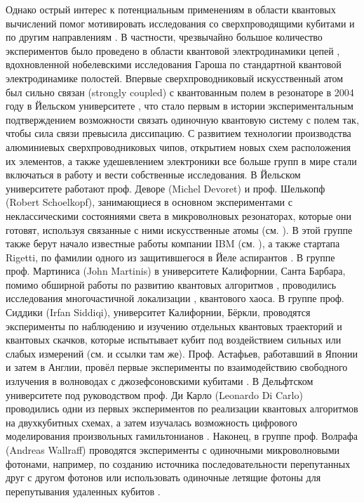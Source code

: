 \documentclass[14pt, a4paper]{extreport}
\numberwithin{equation}{section}
\begin{document}
Однако острый интерес к потенциальным применениям в области квантовых вычислений помог мотивировать исследования со сверхпроводящими кубитами и по другим направлениям \cite{kjaergaard2020superconducting}. В частности, чрезвычайно большое количество экспериментов было проведено в области квантовой электродинамики цепей \cite{blais2020quantum}, вдохновленной нобелевскими исследования Гароша \cite{haroche2013nobel} по стандартной квантовой электродинамике полостей. Впервые сверхпроводниковый искусственный атом был сильно связан (strongly coupled) с квантованным полем в резонаторе в 2004 году в Йельском университете \cite{wallraff2004strong}, что стало первым в истории экспериментальным подтверждением возможности связать одиночную квантовую систему с полем так, чтобы сила связи превысила диссипацию. С развитием технологии производства алюминиевых сверхпроводниковых чипов, открытием новых схем расположения их элементов, а также удешевлением электроники все больше групп в мире стали включаться в работу и вести собственные исследования. В Йельском университете работают проф. Деворе (Michel Devoret) и проф. Шелькопф (Robert Schoelkopf), занимающиеся в основном экспериментами с неклассическими состояниями света в микроволновых резонаторах, которые они готовят, используя связанные с ними искусственные атомы (см. \cite{vlastakis2013deterministically, mirrahimi2014dynamically}). В этой группе также берут начало известные работы компании IBM (см. \cite{jurcevic2020demonstration}), а также стартапа Rigetti, по фамилии одного из защитившегося в Йеле аспирантов \cite{reagor2018demonstration}. В группе проф. Мартиниса (John Martinis) в университете Калифорнии, Санта Барбара, помимо обширной работы по развитию квантовых алгоритмов \cite{arute2019quantum}, проводились исследования многочастичной локализации \cite{chen2014emulating, roushan2017spectroscopic}, квантового хаоса. В группе проф. Сиддики (Irfan Siddiqi), университет Калифорнии, Бёркли, проводятся эксперименты по наблюдению и изучению отдельных квантовых траекторий и квантовых скачков, которые испытывает кубит под воздействием сильных или слабых измерений (см. \cite{hacohen2016quantum} и ссылки там же). Проф. Астафьев, работавший в Японии и затем в Англии, провёл первые эксперименты по взаимодействию свободного излучения в волноводах с джозефсоновскими кубитами \cite{astafiev2010resonance}. В Дельфтском университете под руководством проф. Ди Карло (Leonardo Di Carlo) проводились одни из первых экспериментов по реализации квантовых алгоритмов на двухкубитных схемах, а затем изучалась возможность цифрового моделирования произвольных гамильтонианов \cite{langford2017experimentally}. Наконец, в группе проф. Волрафа (Andreas Wallraff) проводятся эксперименты с одиночными микроволновыми фотонами, например, по созданию источника последовательности перепутанных друг с другом фотонов \cite{besse2020realizing} или использовать одиночные летящие фотоны для перепутывания удаленных кубитов \cite{kurpiers2018deterministic}.
\end{document}
